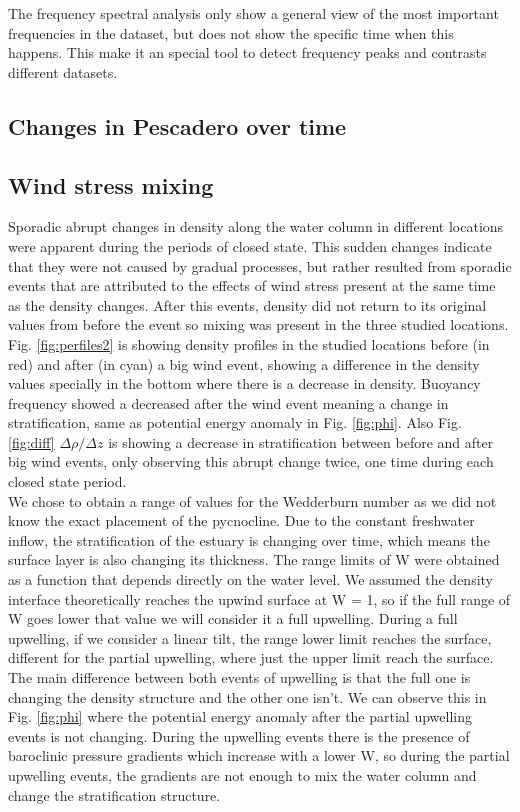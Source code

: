 \documentclass[tesis.tex]{subfiles}
\begin{document}
The frequency spectral analysis only show a general view of the most important frequencies in the dataset, but does not show the specific time when this happens. This make it an special tool to detect frequency peaks and contrasts different datasets.\\

\subsection{Changes in Pescadero over time}

\subsection{Wind stress mixing}

Sporadic abrupt changes in density along the water column in different locations were apparent during the periods of closed state. This sudden changes indicate that they were not caused by gradual processes, but rather resulted from sporadic events that are attributed to the effects of wind stress present at the same time as the density changes. After this events, density did not return to its original values from before the event so mixing was present in the three studied locations.\\

Fig. \ref{fig:perfiles2} is showing density profiles in the studied locations before (in red) and after (in cyan) a big wind event, showing a difference in the density values specially in the bottom where there is a decrease in density. Buoyancy frequency showed a decreased after the wind event meaning a change in stratification, same as potential energy anomaly in Fig. \ref{fig:phi}. Also Fig. \ref{fig:diff} $\Delta \rho/\Delta z$ is showing a decrease in stratification between before and after big wind events, only observing this abrupt change twice, one time during each closed state period.\\

We chose to obtain a range of values for the Wedderburn number as we did not know the exact placement of the pycnocline. Due to the constant freshwater inflow, the stratification of the estuary is changing over time, which means the surface layer is also changing its thickness. The range limits of W were obtained as a function that depends directly on the water level. We assumed the density interface theoretically reaches the upwind surface at W = 1, so if the full range of W goes lower that value we will consider it a full upwelling. During a full upwelling, if we consider a linear tilt, the range lower limit reaches the surface, different for the partial upwelling, where just the upper limit reach the surface. The main difference between both events of upwelling is that the full one is changing the density structure and the other one isn't. We can observe this in Fig. \ref{fig:phi} where the potential energy anomaly after the partial upwelling events is not changing. During the upwelling events there is the presence of baroclinic pressure gradients which increase with a lower W, so during the partial upwelling events, the gradients are not enough to mix the water column and change the stratification structure.\\
\end{document}
